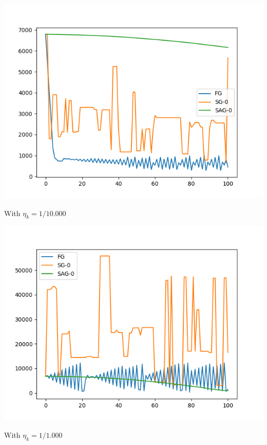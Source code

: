 \documentclass{beamer}
\numberwithin{equation}{aufgabe}
\begin{document}
\begin{frame}
    \includegraphics[width=1.0\textwidth]{images/10000.png}
    \begin{center}
        With $\eta_k = 1/10.000$
    \end{center}
\end{frame}

\begin{frame}
    \includegraphics[width=1.0\textwidth]{images/1000.png}
    \begin{center}
        With $\eta_k = 1/1.000$
    \end{center}
\end{frame}
\end{document}
